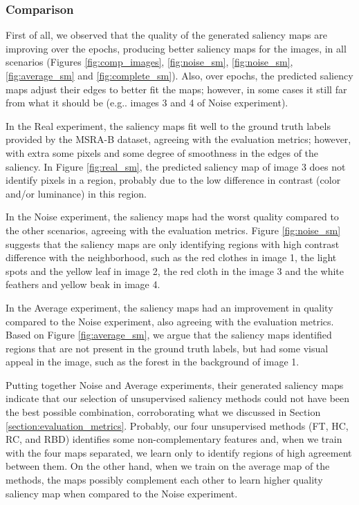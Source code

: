 \documentclass{article}
\makeatletter
\DeclareRobustCommand\onedot{\futurelet\@let@token\@onedot}
\def\@onedot{\ifx\@let@token.\else.\null\fi\xspace}
\def\eg{e.g\onedot} \def\Eg{E.g\onedot}
\makeatother
\begin{document}
\subsubsection{Comparison}

First of all, we observed that the quality of the generated saliency maps are improving over the epochs, producing better saliency maps for the images, in all scenarios (Figures \ref{fig:comp_images}, \ref{fig:noise_sm}, \ref{fig:noise_sm}, \ref{fig:average_sm} and \ref{fig:complete_sm}). Also, over epochs, the predicted saliency maps adjust their edges to better fit the maps; however, in some cases it still far from what it should be (\eg images 3 and 4 of Noise experiment).

In the Real experiment, the saliency maps fit well to the ground truth labels provided by the MSRA-B dataset, agreeing with the evaluation metrics; however, with extra some pixels and some degree of smoothness in the edges of the saliency. In Figure \ref{fig:real_sm}, the predicted saliency map of image 3 does not identify pixels in a region, probably due to the low difference in contrast (color and/or luminance) in this region.

In the Noise experiment, the saliency maps had the worst quality compared to the other scenarios, agreeing with the evaluation metrics. Figure \ref{fig:noise_sm} suggests that the saliency maps are only identifying regions with high contrast difference with the neighborhood, such as the red clothes in image 1, the light spots and the yellow leaf in image 2, the red cloth in the image 3 and the white feathers and yellow beak in image 4.

In the Average experiment, the saliency maps had an improvement in quality compared to the Noise experiment, also agreeing with the evaluation metrics. Based on Figure \ref{fig:average_sm}, we argue that the saliency maps identified regions that are not present in the ground truth labels, but had some visual appeal in the image, such as the forest in the background of image 1. 

Putting together Noise and Average experiments, their generated saliency maps indicate that our selection of unsupervised saliency methods could not have been the best possible combination, corroborating what we discussed in Section \ref{section:evaluation_metrics}. Probably, our four unsupervised methods (FT, HC, RC, and RBD) identifies some non-complementary features and, when we train with the four maps separated, we learn only to identify regions of high agreement between them. On the other hand, when we train on the average map of the methods, the maps possibly complement each other to learn higher quality saliency map when compared to the Noise experiment.
\end{document}
